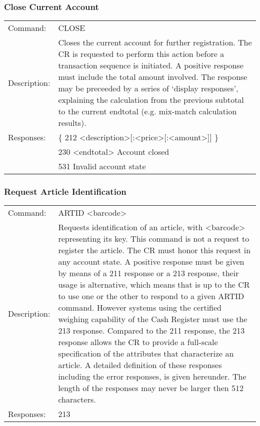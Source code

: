 \subsubsection*{Close Current Account}
\begin{tabular}{lp{350px}}
Command: & CLOSE \\
Description: & Closes the current account for further registration. The CR is requested to perform this action before a transaction sequence is initiated. A positive response must include the total amount involved. The response may be preceeded by a series of `display responses', explaining the calculation from the previous subtotal to the current endtotal (e.g. mix-match calculation results). \\
Responses: & \{ 212 <description>[:<price>[:<amount>]] \} \\
& 230 <endtotal> Account closed \\
& 531 Invalid account state
\end{tabular}

\subsubsection*{Request Article Identification}
\begin{tabular}{lp{350px}}
Command: & ARTID <barcode> \\
Description: & Requests identification of an article, with <barcode> representing its key. This command is not a request to register the article. The CR must honor this request in any account state. A positive response must be given by means of a 211 response or a 213 response, their usage is alternative, which means that is up to the CR to use one or the other to respond to a given ARTID command. However systems using the certified weighing capability of the Cash Register must use the 213 response. Compared to the 211 response, the 213 response allows the CR to provide a full-scale specification of the attributes that characterize an article. A detailed definition of these responses including the error responses, is given hereunder. The length of the responses may never be larger then 512 characters. \\
Responses: & 213
\end{tabular}
  
